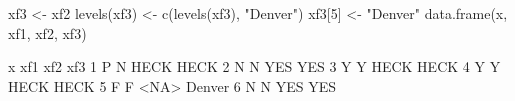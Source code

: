 \begin{Schunk}
\begin{Sinput}
  xf3 <- xf2
  levels(xf3) <- c(levels(xf3), "Denver")
  xf3[5] <- "Denver"
  data.frame(x, xf1, xf2, xf3)
\end{Sinput}
\begin{Soutput}
  x xf1  xf2    xf3
1 P   N HECK   HECK
2 N   N  YES    YES
3 Y   Y HECK   HECK
4 Y   Y HECK   HECK
5 F   F <NA> Denver
6 N   N  YES    YES
\end{Soutput}
\end{Schunk}
